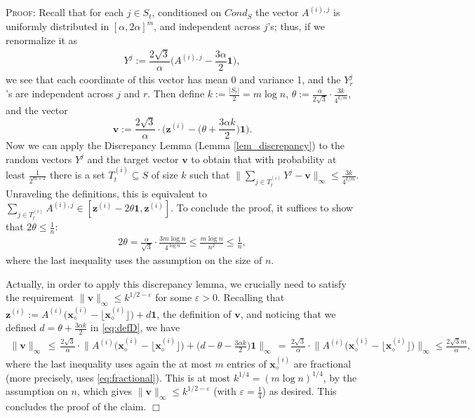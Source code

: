\documentclass{article}
\newcommand{\e}{\varepsilon}
\newcommand{\vv}[0]{\mathbf{v}}
\newcommand{\xv}[0]{\mathbf{x}}
\newcommand{\zv}[0]{\mathbf{z}}
\newcommand{\ones}{{\bm{1}}}
\newenvironment{proof}[1][]
   {\textsc{Proof#1: }}
   {\hfill$\Box$\smallskip}
\begin{document}
\begin{proof}
    Recall that for each $j \in S_t$, conditioned on $Cond_S$ the vector $A^{(i),j}$ is uniformly distributed in $[\alpha, 2\alpha]^m$, and independent across $j$'s; thus, if we renormalize it as
\begin{align*}
    Y^j := \dfrac{2\sqrt{3}}{\alpha} \bigg(A^{(i),j} - \dfrac{3\alpha }{2} \ones\bigg),
\end{align*}
we see that each coordinate of this vector has mean 0 and variance 1, and the $Y^j_r$'s are independent across $j$ and $r$. Then define $k := \frac{|S_t|}{2} = m \log n$, $\theta := \frac{\alpha}{2 \sqrt{3}} \cdot \frac{3k}{4^{k/m}}$, and the vector $$\vv := \frac{2 \sqrt{3}}{\alpha} \cdot \bigg(\zv^{(i)} - \bigg(\theta + \frac{3\alpha k}{2}\bigg) \ones\bigg).$$ 
Now we can apply the Discrepancy Lemma (Lemma \ref{lem_discrepancy}) to the random vectors $Y^j$ and the target vector $\vv$ to obtain that with probability at least $\frac{1}{2^{m+2}}$ there is a set $T^{(i)}_t \subseteq S$ of size $k$ such that $\Big\|\sum_{j \in T^{(i)}_t} Y^j - \vv\Big\|_{\infty} \le \frac{3k}{4^{k/m}}$. Unraveling the definitions, this is equivalent to $\sum_{j \in T^{(i)}_t} A^{(i),j} \in [\zv^{(i)} - 2\theta \ones, \zv^{(i)}]$. To conclude the proof, it suffices to show that $2\theta \le \frac{1}{n}$:
%
\begin{align*}
    2\theta = \frac{\alpha}{\sqrt{3}} \cdot \frac{3 m \log n}{4^{\log n}} \le \frac{m \log n}{n^2} \le \frac{1}{n},
\end{align*}
where the last inequality uses the assumption on the size of $n$.

Actually, in order to apply this discrepancy lemma, we crucially need to satisfy the requirement $\|\vv\|_\infty \le k^{1/2-\e}$ for some $\e > 0$. Recalling that $\zv^{(i)} := A^{(i)} \big(\xv^{(i)}_{\diamond} - \lfloor \xv^{(i)}_\diamond \rfloor) + d \ones$, the definition of $\vv$, and noticing that we defined $d = \theta + \frac{3\alpha k}{2}$ in \eqref{eq:defD}, we have
%
\begin{align*}
    \|\vv\|_{\infty} \,\le\, \frac{2\sqrt{3}}{\alpha} \cdot \Big\|A^{(i)} \big(\xv^{(i)}_{\diamond} - \lfloor \xv^{(i)}_\diamond \rfloor) + \Big(d-\theta - \frac{3\alpha k}{2}\Big)\ones  \Big\|_{\infty} \,=\, \frac{2\sqrt{3}}{\alpha} \cdot \Big\|A^{(i)} \big(\xv^{(i)}_{\diamond} - \lfloor \xv^{(i)}_\diamond \rfloor) \Big\|_{\infty} \le \frac{2 \sqrt{3} m}{\alpha},
\end{align*}
where the last inequality uses again the at most $m$ entries of $\xv^{(i)}_{\diamond}$ are fractional (more precisely, uses \eqref{eq:fractional}). This is at most $k^{1/4} = (m \log n)^{1/4}$, by the {assumption on $n$}, which gives $\|\vv\|_{\infty} \le k^{1/2-\e}$ (with $\e = \frac{1}{4}$) as desired. This concludes the proof of the claim.
\end{proof}
\end{document}
